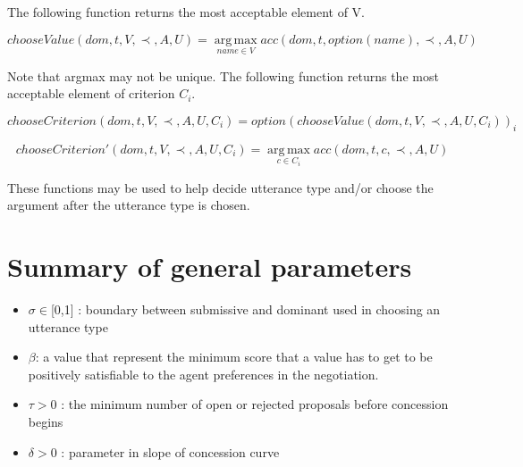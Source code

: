 \documentclass{article}
\begin{document}
	The following function returns the most acceptable element of V.

	 $$ chooseValue(dom, t, V, \prec, A, U) =	\operatorname*{arg\,max}_{name \in V} acc(dom, t, option(name), \prec, A, U) $$
	
	Note that argmax may not be unique.  The following function returns the most acceptable element of	criterion $C_i$.
	
	$$chooseCriterion(dom, t, V, \prec, A, U, C_i) = option(chooseValue(dom, t, V, \prec, A, U, C_i))_i$$
	
	
	$$chooseCriterion'(dom, t, V, \prec, A, U, C_i) =	\operatorname*{arg\,max}_{c\in C_i} acc(dom, t, c, \prec, A, U)$$
	
	These functions may be used to help decide utterance type and/or choose the argument after the utterance type is chosen.
	
	\section{Summary of general parameters }
	\begin{itemize}

		\item $\sigma \in $[0,1] : boundary between submissive and dominant used in
				choosing an utterance type
		\item $\beta$:  a value that represent the minimum score that a value has to get to be positively satisfiable to the agent preferences in the negotiation.
		\item $\tau > 0$ : the minimum number of open or rejected proposals before
				concession begins
		\item $\delta > 0$ : parameter in slope of concession curve
		
		
	\end{itemize}

	
%	
%	
%	
	
\end{document}
